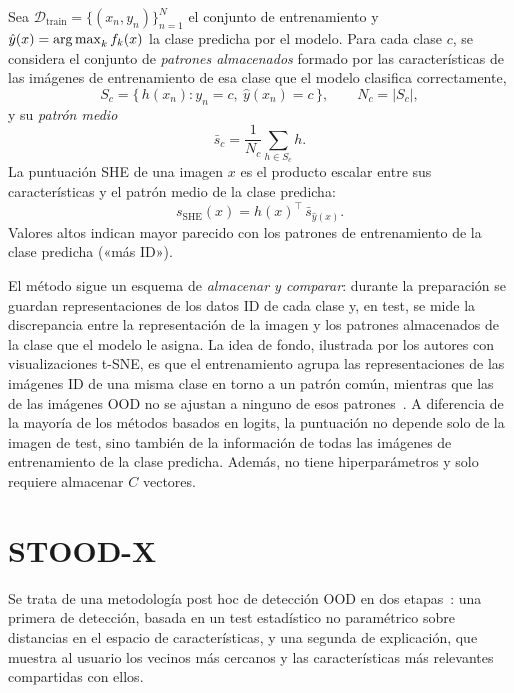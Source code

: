 \begin{definicion}[SHE]\label{def:she}
Sea $\mathcal{D}_{\mathrm{train}} = \{(x_n, y_n)\}_{n=1}^{N}$ el conjunto de entrenamiento y
$\hat y(x) = \operatorname*{arg\,max}_k f_k(x)$ la clase predicha por el modelo. Para cada clase $c$, se
considera el conjunto de \emph{patrones almacenados} formado por las características de las
imágenes de entrenamiento de esa clase que el modelo clasifica correctamente,
\begin{equation}
  S_c = \{\, h(x_n) : y_n = c,\ \hat y(x_n) = c \,\}, \qquad N_c = |S_c|,
\end{equation}
y su \emph{patrón medio}
\begin{equation}
  \bar s_c = \frac{1}{N_c} \sum_{h \in S_c} h .
\end{equation}
La puntuación SHE de una imagen $x$ es el producto escalar entre sus características y el
patrón medio de la clase predicha:
\begin{equation}
  s_{\mathrm{SHE}}(x) = h(x)^{\top} \, \bar s_{\hat y(x)} .
\end{equation}
Valores altos indican mayor parecido con los patrones de entrenamiento de la clase predicha
(«más ID»).
\end{definicion}

El método sigue un esquema de \emph{almacenar y comparar}: durante la preparación se guardan
representaciones de los datos ID de cada clase y, en test, se mide la discrepancia entre la
representación de la imagen y los patrones almacenados de la clase que el modelo le asigna.
La idea de fondo, ilustrada por los autores con visualizaciones t-SNE, es que el entrenamiento
agrupa las representaciones de las imágenes ID de una misma clase en torno a un patrón común,
mientras que las de las imágenes OOD no se ajustan a ninguno de esos patrones~\cite{zhang2023she}.
A diferencia de la mayoría de los métodos basados en logits, la puntuación no depende solo de
la imagen de test, sino también de la información de todas las imágenes de entrenamiento de la
clase predicha. Además, no tiene hiperparámetros y solo requiere almacenar $C$ vectores.

\section{STOOD-X}\label{sec:metodo-stoodx}

Se trata de una metodología post hoc de detección OOD en dos etapas~\cite{sevillano2026}: una primera de detección, basada en un test estadístico no paramétrico sobre distancias en el espacio de características, y una segunda de explicación, que muestra al usuario los vecinos más cercanos y las características más relevantes compartidas con ellos.

